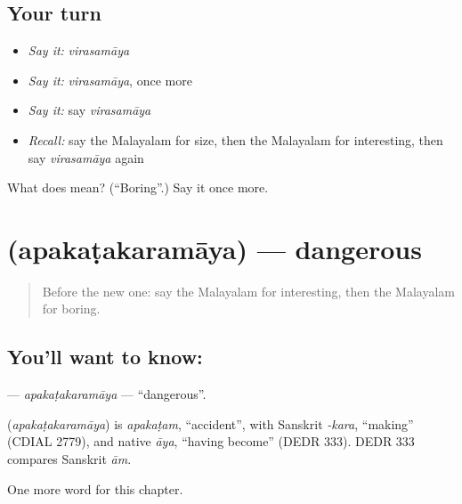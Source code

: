 \subsection*{Your turn}
\begin{itemize}
\raggedright
  \item \emph{Say it:} \emph{virasamāya}
  \item \emph{Say it:} \emph{virasamāya}, once more
  \item \emph{Say it:} say \emph{virasamāya}
  \item \emph{Recall:} say the Malayalam for size, then the Malayalam for interesting, then say \emph{virasamāya} again
\end{itemize}

\begin{tcolorbox}[breakable,colback=teal!4,colframe=teal!35!black,title={Before you move on}]
What does  mean? (\textquotedblleft{}Boring\textquotedblright{}.) Say it once more.
\end{tcolorbox}
\section[\texorpdfstring{\ml{അപകടകരമായ} (apakaṭakaramāya)}{അപകടകരമായ (apakaṭakaramāya)}]{ (apakaṭakaramāya) — dangerous}

\label{lesson:ML-C284-apakatakaramaya}



\begin{quote}
Before the new one: say the Malayalam for interesting, then the Malayalam for boring.
\end{quote}

\subsection*{You'll want to know: }
\textbf{} — \emph{apakaṭakaramāya} — \textquotedblleft{}dangerous\textquotedblright{}.

\begin{cousinweb}
\textbf{} (\emph{apakaṭakaramāya}) is \emph{apakaṭam}, \textquotedblleft{}accident\textquotedblright{}, with Sanskrit \emph{-kara}, \textquotedblleft{}making\textquotedblright{} (CDIAL 2779), and native \emph{āya}, \textquotedblleft{}having become\textquotedblright{} (DEDR 333). DEDR 333 compares Sanskrit \emph{ām}.
\end{cousinweb}

\begin{grammarlens}[title={What you've built}]
One more word for this chapter.
\end{grammarlens}


